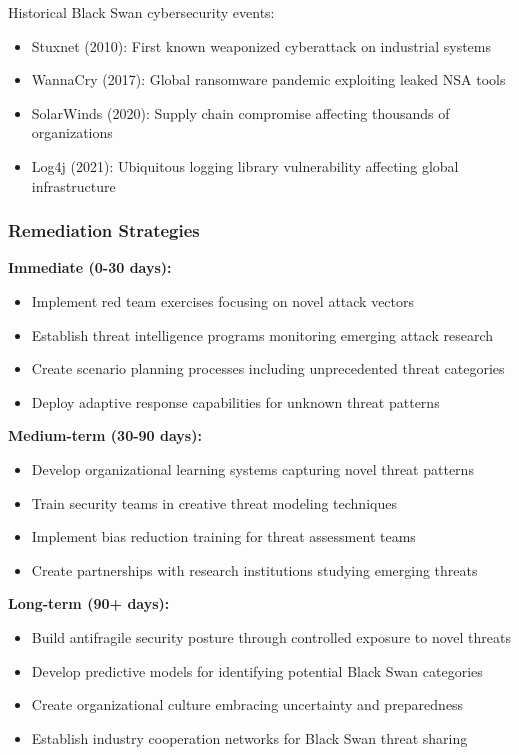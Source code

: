 \documentclass[11pt,a4paper]{article}
\begin{document}
Historical Black Swan cybersecurity events:
\begin{itemize}
\item Stuxnet (2010): First known weaponized cyberattack on industrial systems
\item WannaCry (2017): Global ransomware pandemic exploiting leaked NSA tools
\item SolarWinds (2020): Supply chain compromise affecting thousands of organizations
\item Log4j (2021): Ubiquitous logging library vulnerability affecting global infrastructure
\end{itemize}

\subsubsection{Remediation Strategies}

\textbf{Immediate (0-30 days):}
\begin{itemize}
\item Implement red team exercises focusing on novel attack vectors
\item Establish threat intelligence programs monitoring emerging attack research
\item Create scenario planning processes including unprecedented threat categories
\item Deploy adaptive response capabilities for unknown threat patterns
\end{itemize}

\textbf{Medium-term (30-90 days):}
\begin{itemize}
\item Develop organizational learning systems capturing novel threat patterns
\item Train security teams in creative threat modeling techniques
\item Implement bias reduction training for threat assessment teams
\item Create partnerships with research institutions studying emerging threats
\end{itemize}

\textbf{Long-term (90+ days):}
\begin{itemize}
\item Build antifragile security posture through controlled exposure to novel threats
\item Develop predictive models for identifying potential Black Swan categories
\item Create organizational culture embracing uncertainty and preparedness
\item Establish industry cooperation networks for Black Swan threat sharing
\end{itemize}
\end{document}
